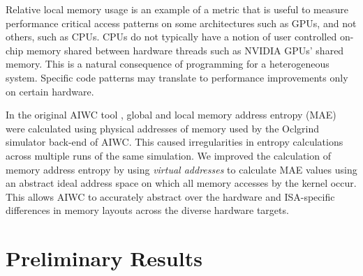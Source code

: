 \documentclass[review=false, sigchi]{acmart}
\begin{document}
	Relative local memory usage is an example of a metric that is useful to measure performance critical access patterns on some architectures such as GPUs, and not others, such as CPUs. CPUs do not typically have a notion of user controlled on-chip memory shared between hardware threads such as NVIDIA GPUs' shared memory. This is a natural consequence of programming for a heterogeneous system. Specific code patterns may translate to performance improvements only on certain hardware.
	
	In the original AIWC tool \cite{beau_johnston_2017_1134175}, global and local memory address entropy (MAE) were calculated using physical addresses of memory used by the Oclgrind simulator back-end of AIWC. This caused irregularities in entropy calculations across multiple runs of the same simulation. We improved the calculation of memory address entropy by using \textit{virtual addresses} to calculate MAE values using an abstract ideal address space on which all memory accesses by the kernel occur. This allows AIWC to accurately abstract over the hardware and ISA-specific differences in memory layouts across the diverse hardware targets.
		
	\section{Preliminary Results} \label{preliminary results}
	
\end{document}
